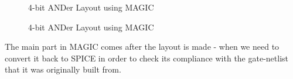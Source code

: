 \documentclass[a4paper, titlepage]{article}
\begin{document}
\begin{figure}[htp]
    \centering
    \hypertarget{4AM}{}
    \caption{4-bit ANDer Layout using MAGIC}
    \label{fig:fig8}
\end{figure}
\begin{figure}[htp]
    \centering
    \hypertarget{4ALUM}{}
    \caption{4-bit ANDer Layout using MAGIC}
    \label{fig:fig9}
\end{figure}\newline
The main part in MAGIC comes after the layout is made - when we need to convert it back to SPICE in order to check its 
compliance with the gate-netlist that it was originally built from. 
\end{document}
